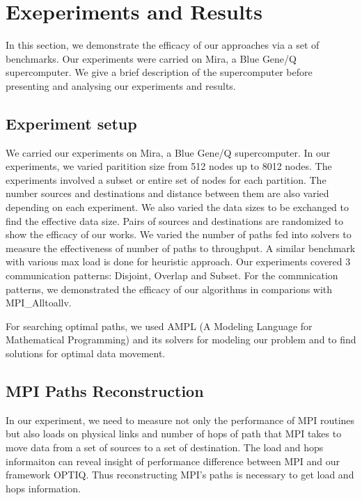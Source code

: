 \section{Exeperiments and Results}
\label{sec:benchmark}

In this section, we demonstrate the efficacy of our approaches via a set of benchmarks. Our experiments were carried on Mira, a Blue Gene/Q supercomputer. We give a brief description of the supercomputer before presenting and analysing our experiments and results.



\subsection{Experiment setup}

We carried our experiments on Mira, a Blue Gene/Q supercomputer. In our experiments, we varied paritition size from 512 nodes up to 8012 nodes. The experiments involved a subset or entire set of nodes for each partition. The number sources and destinations and distance between them are also varied depending on each experiment. We also varied the data sizes to be exchanged to find the effective data size. Pairs of sources and destinations are randomized to show the efficacy of our works. We varied the number of paths fed into solvers to measure the effectiveness of number of paths to throughput. A similar benchmark with various max load is done for heuristic approach. Our experiments covered 3 communication patterns: Disjoint, Overlap and Subset. For the commnication patterns, we demonstrated the efficacy of our algorithms in comparions with MPI\_Alltoallv.

For searching optimal paths, we used AMPL (A Modeling Language for Mathematical Programming) and its solvers \cite{AMPL} for modeling our problem and to find solutions for optimal data movement.

\subsection{MPI Paths Reconstruction}

In our experiment, we need to measure not only the performance of MPI routines but also loads on physical links and number of hops of path that MPI takes to move data from a set of sources to a set of destination. The load and hops informaiton can reveal insight of performance difference between MPI and our framework OPTIQ. Thus reconstructing MPI's paths is necessary to get load and hops information.

